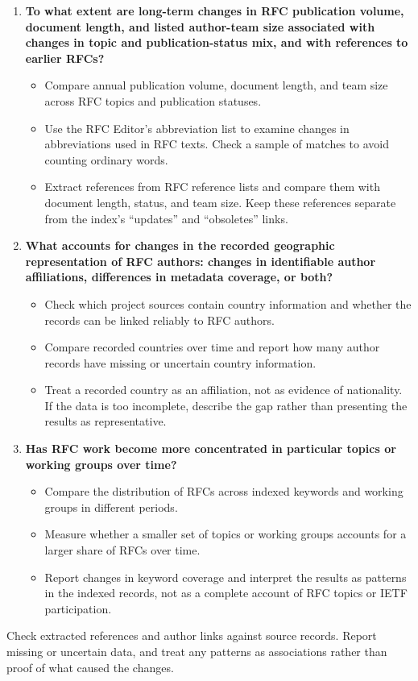 \begin{enumerate}
    \item \textbf{To what extent are long-term changes in RFC publication
    volume, document length, and listed author-team size associated with
    changes in topic and publication-status mix, and with references to
    earlier RFCs?}
    \begin{itemize}
        \item Compare annual publication volume, document length, and team
        size across RFC topics and publication statuses.
        \item Use the RFC Editor's abbreviation list to examine changes in
        abbreviations used in RFC texts. Check a sample of matches to avoid
        counting ordinary words.
        \item Extract references from RFC reference lists and compare them
        with document length, status, and team size. Keep these references
        separate from the index's ``updates'' and ``obsoletes'' links.
    \end{itemize}

    \item \textbf{What accounts for changes in the recorded geographic
    representation of RFC authors: changes in identifiable author
    affiliations, differences in metadata coverage, or both?}
    \begin{itemize}
        \item Check which project sources contain country information and
        whether the records can be linked reliably to RFC authors.
        \item Compare recorded countries over time and report how many author
        records have missing or uncertain country information.
        \item Treat a recorded country as an affiliation, not as evidence of
        nationality. If the data is too incomplete, describe the gap rather
        than presenting the results as representative.
    \end{itemize}

    \item \textbf{Has RFC work become more concentrated in particular topics
    or working groups over time?}
    \begin{itemize}
        \item Compare the distribution of RFCs across indexed keywords and
        working groups in different periods.
        \item Measure whether a smaller set of topics or working groups
        accounts for a larger share of RFCs over time.
        \item Report changes in keyword coverage and interpret the results
        as patterns in the indexed records, not as a complete account of RFC
        topics or IETF participation.
    \end{itemize}
\end{enumerate}

Check extracted references and author links against source records. Report
missing or uncertain data, and treat any patterns as associations rather than
proof of what caused the changes.
